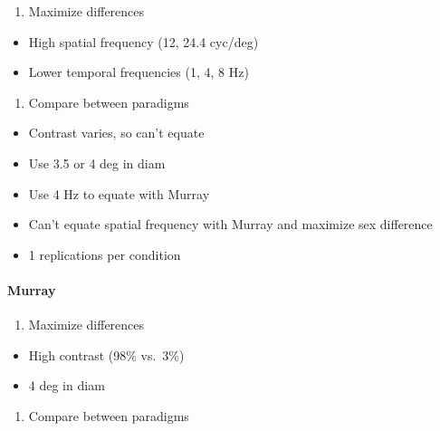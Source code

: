\documentclass[]{article}
\providecommand{\tightlist}{%
  \setlength{\itemsep}{0pt}\setlength{\parskip}{0pt}}
\let\oldparagraph\paragraph
\renewcommand{\paragraph}[1]{\oldparagraph{#1}\mbox{}}
\begin{document}
\begin{enumerate}
\def\labelenumi{\arabic{enumi}.}
\tightlist
\item
  Maximize differences
\end{enumerate}

\begin{itemize}
\tightlist
\item
  High spatial frequency (12, 24.4 cyc/deg)
\item
  Lower temporal frequencies (1, 4, 8 Hz)
\end{itemize}

\begin{enumerate}
\def\labelenumi{\arabic{enumi}.}
\setcounter{enumi}{2}
\tightlist
\item
  Compare between paradigms
\end{enumerate}

\begin{itemize}
\tightlist
\item
  Contrast varies, so can't equate
\item
  Use 3.5 or 4 deg in diam
\item
  Use 4 Hz to equate with Murray
\item
  Can't equate spatial frequency with Murray and maximize sex difference
\item
  1 replications per condition
\end{itemize}

\hypertarget{murray}{%
\paragraph{Murray}\label{murray}}

\begin{enumerate}
\def\labelenumi{\arabic{enumi}.}
\tightlist
\item
  Maximize differences
\end{enumerate}

\begin{itemize}
\tightlist
\item
  High contrast (98\% vs.~3\%)
\item
  4 deg in diam
\end{itemize}

\begin{enumerate}
\def\labelenumi{\arabic{enumi}.}
\setcounter{enumi}{2}
\tightlist
\item
  Compare between paradigms
\end{enumerate}
\end{document}
